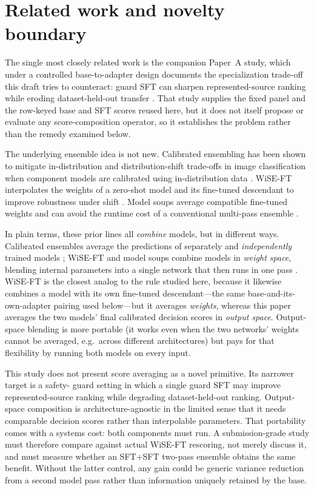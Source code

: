 \documentclass[11pt]{article}
\begin{document}
\section{Related work and novelty boundary}
\label{sec:related}

The single most closely related work is the companion Paper~A study, which under a controlled base-to-adapter design documents the specialization trade-off this draft tries to counteract: guard SFT can sharpen represented-source ranking while eroding dataset-held-out transfer \citep{rahimi2026benchmark}. That study supplies the fixed panel and the row-keyed base and SFT scores reused here, but it does not itself propose or evaluate any score-composition operator, so it establishes the problem rather than the remedy examined below.

The underlying ensemble idea is not new.  Calibrated ensembling has been shown to mitigate
in-distribution and distribution-shift trade-offs in image classification when component models
are calibrated using in-distribution data \citep{kumar2022calibrated}.  WiSE-FT interpolates the
weights of a zero-shot model and its fine-tuned descendant to improve robustness under shift
\citep{wortsman2022wiseft}.  Model soups average compatible fine-tuned weights and can avoid the
runtime cost of a conventional multi-pass ensemble \citep{wortsman2022modelsoups}.

In plain terms, these prior lines all \emph{combine} models, but in different ways. Calibrated ensembles average the predictions of separately and \emph{independently} trained models \citep{kumar2022calibrated}; WiSE-FT and model soups combine models in \emph{weight space}, blending internal parameters into a single network that then runs in one pass \citep{wortsman2022wiseft,wortsman2022modelsoups}. WiSE-FT is the closest analog to the rule studied here, because it likewise combines a model with its own fine-tuned descendant---the same base-and-its-own-adapter pairing used below---but it averages \emph{weights}, whereas this paper averages the two models' final calibrated decision scores in \emph{output space}. Output-space blending is more portable (it works even when the two networks' weights cannot be averaged, e.g.\ across different architectures) but pays for that flexibility by running both models on every input.

This study does not present score averaging as a novel primitive.  Its narrower target is a safety-
guard setting in which a single guard SFT may improve represented-source ranking while degrading
dataset-held-out ranking.  Output-space composition is architecture-agnostic in the limited sense
that it needs comparable decision scores rather than interpolable parameters.  That portability
comes with a systems cost: both components must run.  A submission-grade study must therefore
compare against actual WiSE-FT rescoring, not merely discuss it, and must measure whether an
SFT+SFT two-pass ensemble obtains the same benefit.  Without the latter control, any gain could be
generic variance reduction from a second model pass rather than information uniquely retained by
the base.
\end{document}
